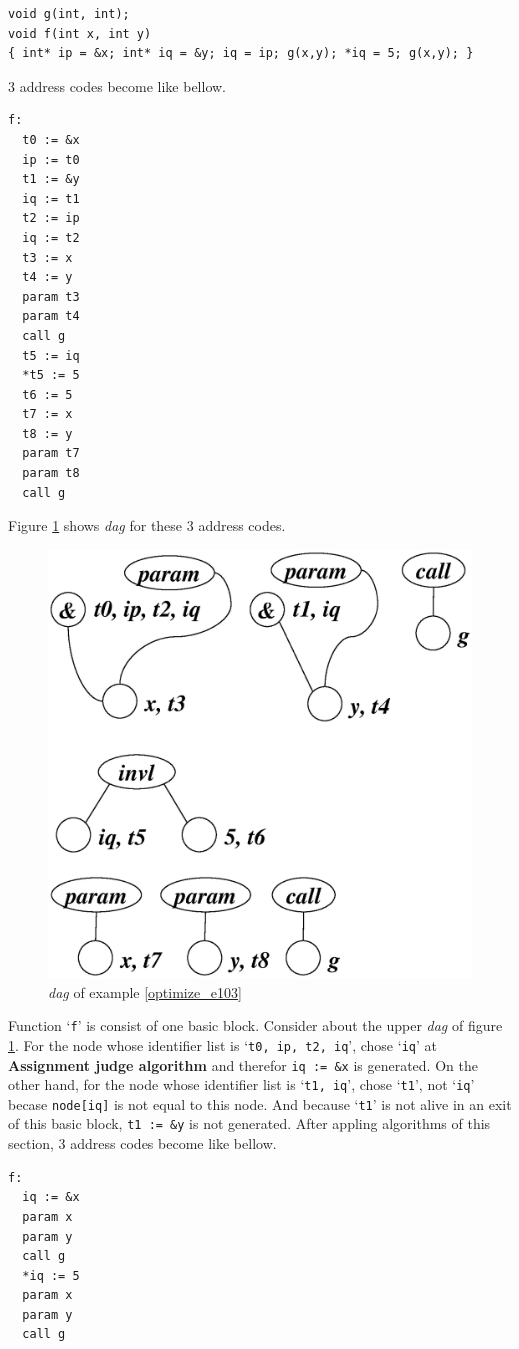 \begin{Example}
\begin{verbatim}
void g(int, int);
void f(int x, int y)
{ int* ip = &x; int* iq = &y; iq = ip; g(x,y); *iq = 5; g(x,y); }
\end{verbatim}
3 address codes become like bellow.
\begin{verbatim}
f:
  t0 := &x
  ip := t0
  t1 := &y
  iq := t1
  t2 := ip
  iq := t2
  t3 := x
  t4 := y
  param t3
  param t4
  call g
  t5 := iq
  *t5 := 5
  t6 := 5
  t7 := x
  t8 := y
  param t7
  param t8
  call g
\end{verbatim}
Figure \ref{optimize_e104} shows {\em dag} for these 3 address codes.
\begin{figure}[htbp]
\begin{center}
\includegraphics[width=0.788\linewidth,height=0.8\linewidth]{opt045.eps}
\caption{{\em dag} of example \ref{optimize_e103}}
\label{optimize_e104}
\end{center}
\end{figure}
Function `{\tt{f}}' is consist of one basic block.
Consider about the upper {\em dag} of figure \ref{optimize_e104}.
For the node whose identifier list is `{\tt{t0, ip, t2, iq}}',
chose `{\tt{iq}}' at {\bf Assignment judge algorithm} and
therefor {\tt{iq := \&x}} is generated.
On the other hand, for the node whose identifier list
is `{\tt{t1, iq}}', chose `{\tt{t1}}', not `{\tt{iq}}'
becase {\tt{node[iq]}} is not equal to this node. 
And because `{\tt{t1}}' is not alive in an exit of this basic
block, {\tt{t1 := \&y}} is not generated.
After appling algorithms of this section,
3 address codes become like bellow.
\begin{verbatim}
f:
  iq := &x
  param x
  param y
  call g
  *iq := 5
  param x
  param y
  call g
\end{verbatim}
\end{Example}

